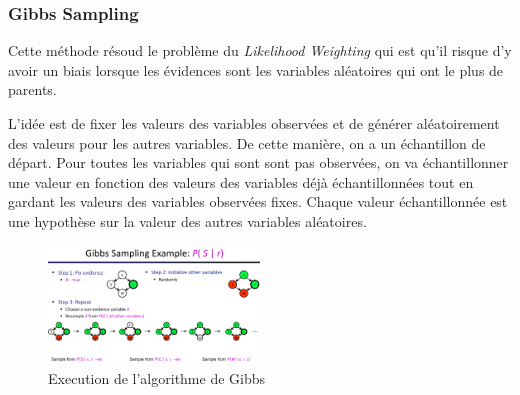 \subsubsection{Gibbs Sampling} %
\label{sec:gibbs_sampling} 

Cette méthode résoud le problème du \textit{Likelihood Weighting} qui est qu'il risque 
d'y avoir un biais lorsque les évidences sont les variables aléatoires qui ont le plus de parents.

L'idée est de fixer les valeurs des variables observées et de générer aléatoirement des valeurs pour les autres variables. 
De cette manière, on a un échantillon de départ. Pour toutes les variables qui sont sont pas observées, on va échantillonner une valeur en fonction des valeurs des variables déjà échantillonnées tout en 
gardant les valeurs des variables observées fixes.
Chaque valeur échantillonnée est une hypothèse sur la valeur des autres variables aléatoires.

\begin{figure}[H]
    \begin{center}
        \includegraphics[width=0.5\textwidth]{pictures/gibbs.png}
    \end{center}
    \caption{Execution de l'algorithme de Gibbs}\label{fig:gibbs}
\end{figure}





















